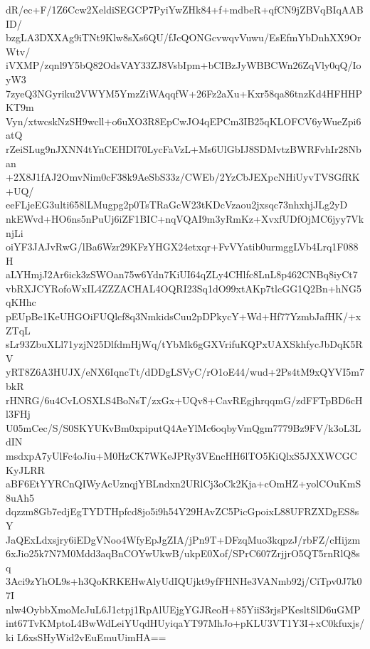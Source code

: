 dR/ec+F/1Z6Ccw2XeldiSEGCP7PyiYwZHk84+f+mdbeR+qfCN9jZBVqBIqAABID/
bzgLA3DXXAg9iTNt9Klw8sXs6QU/fJcQONGcvwqvVuwu/EsEfmYbDnhXX9OrWtv/
iVXMP/zqnl9Y5bQ82OdsVAY33ZJ8VsbIpm+bCIBzJyWBBCWn26ZqVly0qQ/IoyW3
7zyeQ3NGyriku2VWYM5YmzZiWAqqfW+26Fz2aXu+Kxr58qa86tnzKd4HFHHPKT9m
Vyn/xtwcskNzSH9wcll+o6uXO3R8EpCwJO4qEPCm3IB25qKLOFCV6yWueZpi6atQ
rZeiSLug9nJXNN4tYnCEHDI70LycFaVzL+Ms6UlGbIJ8SDMvtzBWRFvhIr28Nban
+2X8J1fAJ2OmvNim0cF38k9AeSbS33z/CWEb/2YzCbJEXpcNHiUyvTVSGfRK+UQ/
eeFLjeEG3ulti658lLMugpg2p0TsTRaGcW23tKDcVzaou2jxsqc73nhxhjJLg2yD
nkEWvd+HO6ns5nPuUj6iZF1BIC+nqVQAI9m3yRmKz+XvxfUDfOjMC6jyy7VknjLi
oiYF3JAJvRwG/lBa6Wzr29KFzYHGX24etxqr+FvVYatib0urmggLVb4Lrq1F088H
aLYHmjJ2Ar6ick3zSWOan75w6Ydn7KiUI64qZLy4CHlfc8LnL8p462CNBq8iyCt7
vbRXJCYRofoWxIL4ZZZACHAL4OQRI23Sq1dO99xtAKp7tlcGG1Q2Bn+hNG5qKHhc
pEUpBe1KeUHGOiFUQlcf8q3NmkidsCuu2pDPkycY+Wd+Hf77YzmbJafHK/+xZTqL
sLr93ZbuXLl71yzjN25DlfdmHjWq/tYbMk6gGXVrifuKQPxUAXSkhfycJbDqK5RV
yRT8Z6A3HUJX/eNX6IqncTt/dDDgLSVyC/rO1oE44/wud+2Ps4tM9xQYVI5m7bkR
rHNRG/6u4CvLOSXLS4BoNsT/zxGx+UQv8+CavREgjhrqqmG/zdFFTpBD6cHl3FHj
U05mCec/S/S0SKYUKvBm0xpiputQ4AeYlMc6oqbyVmQgm7779Bz9FV/k3oL3LdIN
msdxpA7yUlFc4oJiu+M0HzCK7WKeJPRy3VEncHH6lTO5KiQlxS5JXXWCGCKyJLRR
aBF6EtYYRCnQIWyAcUznqjYBLndxn2URlCj3oCk2Kja+cOmHZ+yolCOuKmS8uAh5
dqzzm8Gb7edjEgTYDTHpfcd8jo5i9h54Y29HAvZC5PicGpoixL88UFRZXDgES8sY
JaQExLdxsjry6iEDgVNoo4WfyEpJgZIA/jPn9T+DFzqMuo3kqpzJ/rbFZ/cHijzm
6xJio25k7N7M0Mdd3aqBnCOYwUkwB/ukpE0Xof/SPrC607ZrjjrO5QT5rnRlQ8sq
3Aci9zYhOL9s+h3QoKRKEHwAlyUdIQUjkt9yfFHNHe3VANmb92j/CiTpv0J7k07I
nlw4OybbXmoMcJuL6J1ctpj1RpAlUEjgYGJReoH+85YiiS3rjsPKesltSlD6uGMP
int67TvKMptoL4BwWdLeiYUqdHUyiqaYT97MhJo+pKLU3VT1Y3I+xC0kfuxjs/ki
L6xsSHyWid2vEuEmuUimHA==
